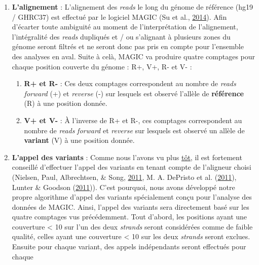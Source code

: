 \documentclass[12pt,twoside]{reedthesis}
\providecommand{\tightlist}{%
  \setlength{\itemsep}{0pt}\setlength{\parskip}{0pt}}
\theoremstyle{definition}
\theoremstyle{definition}
\theoremstyle{remark}
\begin{document}
  \begin{enumerate}
  \def\labelenumi{\arabic{enumi}.}
  \tightlist
  \item
    \textbf{L'alignement} : L'alignement des \emph{reads} le long du
    génome de référence (hg19 / GHRC37) est effectué par le logiciel MAGIC
    (Su et al., \protect\hyperlink{ref-Su2014}{2014}). Afin d'écarter
    toute ambiguité au moment de l'interprétation de l'alignement,
    l'intégralité des \emph{reads} dupliqués et / ou s'alignant à
    plusieurs zones du génome seront filtrés et ne seront donc pas pris en
    compte pour l'ensemble des analyses en aval. Suite à celà, MAGIC va
    produire quatre comptages pour chaque position couverte du génome :
    R+, V+, R- et V- :
  
    \begin{enumerate}
    \def\labelenumii{\alph{enumii}.}
    \tightlist
    \item
      \textbf{R+ et R-} : Ces deux comptages correspondent au nombre de
      \emph{reads} \emph{forward} (+) et \emph{reverse} (-) sur lesquels
      est observé l'allèle de \textbf{référence} (R) à une position
      donnée.\\
    \item
      \textbf{V+ et V-} : À l'inverse de R+ et R-, ces comptages
      correspondent au nombre de \emph{reads} \emph{forward} et
      \emph{reverse} sur lesquels est observé un allèle de
      \textbf{variant} (V) à une position donnée.\\
    \end{enumerate}
  \item
    \textbf{L'appel des variants} : Comme nous l'avons vu plus
    \protect\hyperlink{varcall}{tôt}, il est fortement conseillé
    d'effectuer l'appel des variants en tenant compte de l'aligneur choisi
    (Nielsen, Paul, Albrechtsen, \& Song,
    \protect\hyperlink{ref-Nielsen2011}{2011}, M. A. DePristo et al.
    (\protect\hyperlink{ref-DePristo2011}{2011}), Lunter \& Goodson
    (\protect\hyperlink{ref-Lunter2011}{2011})). C'est pourquoi, nous
    avons développé notre propre algorithme d'appel des variants
    spécialement conçu pour l'analyse des données de MAGIC. Ainsi, l'appel
    des variants sera directement basé sur les quatre comptages vus
    précédemment. Tout d'abord, les positions ayant une couverture
    \textless{} 10 sur l'un des deux \emph{strands} seront considérées
    comme de faible qualité, celles ayant une couverture \textless{} 10
    sur les deux \emph{strands} seront exclues. Ensuite pour chaque
    variant, des appels indépendants seront effectués pour chaque

\end{enumerate}
\end{document}
